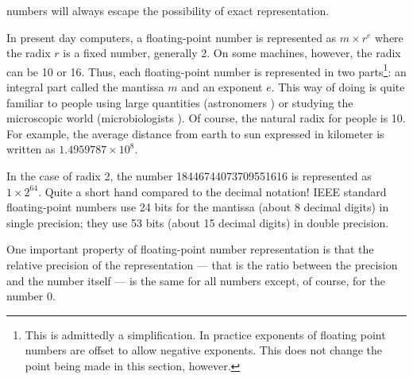 numbers will always escape the possibility of exact
representation.
\par
In present day computers, a floating-point number is represented
as $m\times r^e$ where the radix $r$ is a fixed number, generally
2. On some machines, however, the radix can be 10 or 16. Thus,
each floating-point number is represented in two
parts\footnote{This is admittedly a simplification. In practice
exponents of floating point numbers are offset to allow negative
exponents. This does not change the point being made in this
section, however.}: an integral part called the mantissa $m$ and
an exponent $e$. This way of doing is quite familiar to people
using large quantities (astronomers \eg) or studying the
microscopic world (microbiologists \eg). Of course, the natural
radix for people is 10. For example, the average distance from
earth to sun expressed in kilometer is written as
$1.4959787\times10^8$.

In the case of radix 2, the number 18446744073709551616 is
represented as $1\times2^{64}$. Quite a short hand compared to the
decimal notation! IEEE standard floating-point numbers use 24 bits
for the mantissa (about 8 decimal digits) in single precision;
they use 53 bits (about 15 decimal digits) in double precision.
\par
One important property of floating-point number representation is
that the relative precision of the representation --- that is the
ratio between the precision and the number itself --- is the same
for all numbers except, of course, for the number 0.

